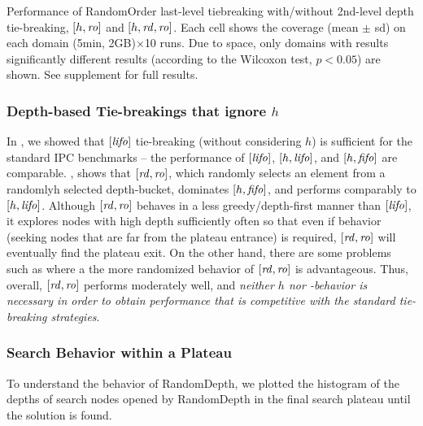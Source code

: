 \begin{table}[tb]
 \setlength{\tabcolsep}{0.3em}
 \centering {}
 
 \caption{Performance of RandomOrder last-level tiebreaking with/without 2nd-level depth tie-breaking, $[h,\mbox{\textit{ro}}]$ and $[h,\mbox{\textit{rd}},\mbox{\textit{ro}}]$. Each cell
 shows the coverage (mean $\pm$ sd) on each domain (5min, 2GB)$\times$10 runs. 
Due to space, only domains with results 
 significantly different results  (according to the Wilcoxon test, $p<0.05$) are shown.
See supplement for full results.
 }  \label{r-vs-rd-random}
\end{table}




\subsubsection{Depth-based Tie-breakings that ignore $h$}

In , we showed that $[\mbox{\textit{lifo}}]$ tie-breaking (without considering $h$) is
sufficient for the standard IPC benchmarks -- the performance of $[\mbox{\textit{lifo}}]$, $[h,\mbox{\textit{lifo}}]$, and $[h,\mbox{\textit{fifo}}]$ are comparable.
, shows that $[\mbox{\textit{rd}},\mbox{\textit{ro}}]$, which randomly selects an element from a randomlyh selected depth-bucket, dominates $[h,\mbox{\textit{fifo}}]$,
and performs comparably to $[h,\mbox{\textit{lifo}}]$.
Although $[\mbox{\textit{rd}},\mbox{\textit{ro}}]$ behaves in a less greedy/depth-first manner than $[\mbox{\textit{lifo}}]$, 
it explores nodes with high depth sufficiently often so that even if \lifo behavior (seeking nodes that are far from the plateau entrance) is required, $[\mbox{\textit{rd}},\mbox{\textit{ro}}]$ will eventually find the plateau exit.
On the other hand, there are some problems such as  where a the more randomized behavior of $[\mbox{\textit{rd}},\mbox{\textit{ro}}]$ is advantageous.
Thus, overall, $[\mbox{\textit{rd}},\mbox{\textit{ro}}]$ performs moderately well, and 
\emph{neither $h$ nor \lifo-behavior is necessary in order to obtain performance that is competitive with the standard
tie-breaking strategies}.




\subsubsection{Search Behavior within a Plateau}

To understand the behavior of RandomDepth, we plotted the histogram of
the depths of search nodes opened by RandomDepth in the final search
plateau until the solution is found.

